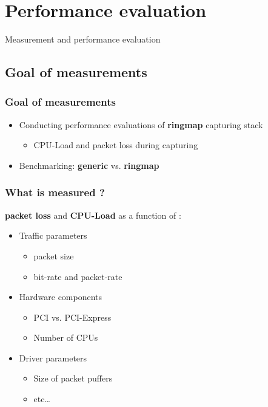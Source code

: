 \documentclass{beamer}
\begin{document}
\section{Performance evaluation}
\begin{frame}
	\begin{center}
	\huge{Measurement and  performance evaluation}
	\end{center}
\end{frame}

\subsection*{Goal of measurements}

\begin{frame}
\frametitle{Goal of measurements}
\begin{itemize}
	\item Conducting performance evaluations of \textbf{ringmap} capturing stack
		\begin{itemize}
			\item CPU-Load and packet loss during capturing\newline
		\end{itemize}
	\item Benchmarking: \textbf{generic} vs. \textbf{ringmap}
\end{itemize}
\end{frame}

\begin{frame}
\frametitle{What is measured ?}
\textbf{packet loss} and \textbf{CPU-Load} as a function of :\newline
\begin{itemize}
	\item Traffic parameters
		\begin{itemize}
			\item packet size
			\item bit-rate and packet-rate
		\end{itemize}

\color{gray}
	\item  Hardware components
		\begin{itemize}
\color{gray}
			\item PCI vs. PCI-Express
			\item Number of CPUs
		\end{itemize}
	\item Driver parameters
		\begin{itemize}
\color{gray}
			\item Size of packet puffers 
			\item etc\ldots
		\end{itemize}
\end{itemize}
\normalcolor
\end{frame}
\end{document}
